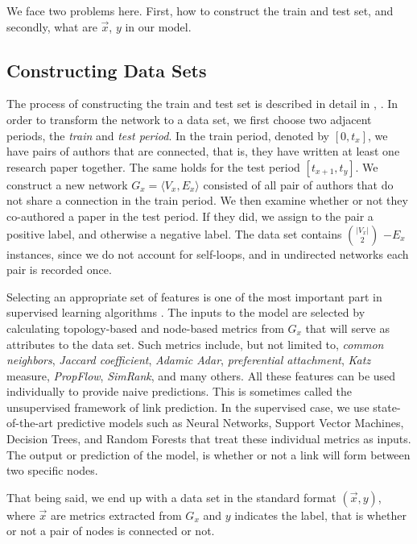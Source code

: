 \documentclass{acm_proc_article-sp}
\begin{document}
 We face two problems here. First, how to construct the train and test set, and secondly, what are $\vec{x}$, $y$ in our model.

\subsection{Constructing Data Sets}
The process of constructing the train and test set is described in detail in \cite{Hasan06linkprediction}, \cite{Lichtenwalter:2010:NPM:1835804.1835837}. In order to transform the network to a data set, we first choose two adjacent periods, the \textit{train} and \textit{test period}. In the train period, denoted by $[0,t_x]$, we have pairs of authors that are connected, that is, they have written at least one research paper together. The same holds for the test period $[t_{x+1},t_y]$. We construct a new network $G_x = \langle V_x, E_x \rangle$ consisted of all pair of authors that do not share a connection in the train period. We then examine whether or not they co-authored a paper in the test period. If they did, we assign to the pair a positive label, and otherwise a negative label. The data set contains $|V_x| \choose 2$ $-E_x$ instances, since we do not account for self-loops, and in undirected networks each pair is recorded once. 

Selecting an appropriate set of features is one of the most important part in supervised learning algorithms \cite{Hasan06linkprediction}. The inputs to the model are selected by calculating topology-based and node-based metrics from $G_x$ that will serve as attributes to the data set. Such metrics include, but not limited to, \textit{common neighbors}, \textit{Jaccard coefficient}, \textit{Adamic Adar}, \textit{preferential attachment}, \textit{Katz} measure, \textit{PropFlow}, \textit{SimRank}, and many others. All these features can be used individually to provide naive predictions. This is sometimes called the unsupervised framework of link prediction. In the supervised case, we use state-of-the-art predictive models such as Neural Networks, Support Vector Machines, Decision Trees, and Random Forests that treat these individual metrics as inputs. The output or prediction of the model, is whether or not a link will form between two specific nodes. 

That being said, we end up with a data set in the standard format $(\vec{x},y)$, where $\vec{x}$ are metrics extracted from $G_x$ and $y$ indicates the label, that is whether or not a pair of nodes is connected or not. 
\end{document}
